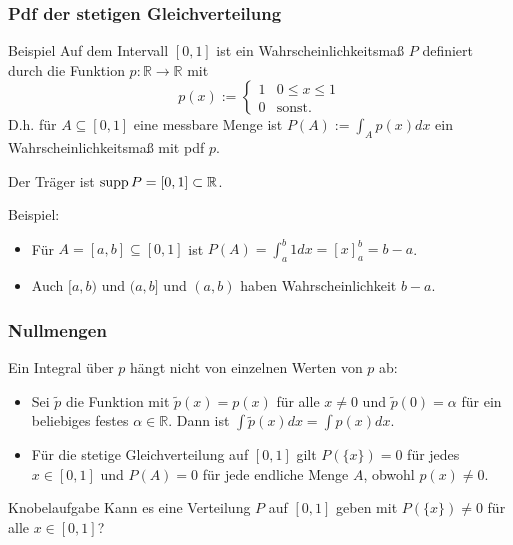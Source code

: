 \begin{frame}
  \frametitle{Pdf der stetigen Gleichverteilung}
  \vspace{-1cm}
  \begin{block}{Beispiel}
    Auf dem Intervall $[0,1]$ ist ein Wahrscheinlichkeitsmaß $P$ definiert durch
    die Funktion $p \colon \mathbb{R} \to \mathbb{R}$ mit
    \[p(x) := \begin{cases} 1 & 0 \leq x \leq 1 \\ 0 & \text{sonst.} \end{cases}\]
    D.h. für $A \subseteq [0,1]$ eine messbare Menge ist
    $P(A) := \int_A p(x) dx$
    ein Wahrscheinlichkeitsmaß mit pdf $p$.\pause

    Der Träger ist $\operatorname{supp} P = [0,1] \subset \mathbb{R}$.
  \end{block}

\medskip \pause 
  
Beispiel:
\begin{itemize}
\item Für $A = [a,b] \subseteq [0,1]$ ist $P(A) = \int_a^b 1 dx = [x]_a^b = b-a$.\smallskip\pause
\item Auch $[a,b)$ und $(a,b]$ und $(a,b)$ haben Wahrscheinlichkeit $b-a$.
\end{itemize}
\end{frame}

\begin{frame}
  \frametitle{Nullmengen}
  Ein Integral über $p$ hängt nicht von einzelnen Werten von $p$ ab:\pause

\begin{itemize} 
\item Sei $\tilde{p}$ die Funktion mit $\tilde{p}(x)=p(x)$ für alle $x \neq 0$ und $\tilde{p}(0) = \alpha$ für ein beliebiges festes $\alpha \in \mathbb{R}$. Dann ist $\int \tilde{p}(x) dx = \int p(x) dx$.\smallskip\pause
\item Für die stetige Gleichverteilung auf $[0,1]$ gilt $P(\{x\}) = 0$ für jedes $x \in [0,1]$ und $P(A) = 0$ für jede endliche Menge $A$, obwohl $p(x) \neq 0$.\smallskip\pause
\end{itemize}

\bigskip

\begin{block}{Knobelaufgabe}
Kann es eine Verteilung $P$ auf $[0,1]$ geben mit $P(\{x\}) \neq 0$ für alle $x \in [0,1]$?
\end{block}
\end{frame}

